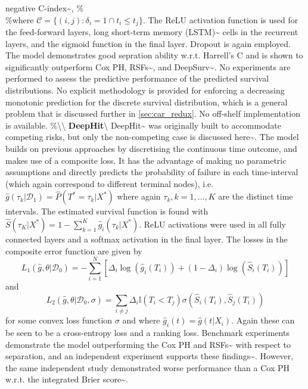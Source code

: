 \documentclass[
  letterpaper,
]{scrbook}
\theoremstyle{plain}
\theoremstyle{definition}
\theoremstyle{remark}
\begin{document}
negative C-index\textasciitilde{}\cite{Steck2008}, \%\[
%
\] \%where \(\mathcal{C}= \{(i,j) : \delta_i = 1 \cap t_i \leq t_j\}\).
The ReLU activation function is used for the feed-forward layers, long
short-term memory (LSTM)\textasciitilde{}\cite{Hochreiter1997} cells in
the recurrent layers, and the sigmoid function in the final layer.
Dropout is again employed. The model demonstrates good sepration ability
w.r.t. Harrell's C and is shown to significantly outperform Cox PH,
RSFs\textasciitilde{}\cite{Ishwaran2008}, and
DeepSurv\textasciitilde{}\cite{Katzman2018}. No experiments are
performed to assess the predictive performance of the predicted survival
distributions. No explicit methodology is provided for enforcing a
decreasing monotonic prediction for the discrete survival distribution,
which is a general problem that is discussed further in
\ref{sec:car_redux}. No off-shelf implementation is available.
\%\textbackslash\textbackslash{}
\textbf{DeepHit}\label{mod:deephit}\textbackslash{}
DeepHit\textasciitilde{}\cite{Lee2018a} was originally built to
accommodate competing risks, but only the non-competing case is
discussed here\textasciitilde{}\cite{Kvamme2019a}. The model builds on
previous approaches by discretising the continuous time outcome, and
makes use of a composite loss. It has the advantage of making no
parametric assumptions and directly predicts the probability of failure
in each time-interval (which again correspond to different terminal
nodes),
i.e.~\(\hat{g}(\tau_k|\mathcal{D}_1) = \hat{P}(T^* = \tau_k|X^*)\) where
again \(\tau_k, k = 1,...,K\) are the distinct time intervals. The
estimated survival function is found with
\(\hat{S}(\tau_K|X^*) = 1 - \sum^K_{k = 1} \hat{g}_i(\tau_k|X^*)\). ReLU
activations were used in all fully connected layers and a softmax
activation in the final layer. The losses in the composite error
function are given by \[
L_1(\hat{g}, \theta|\mathcal{D}_0) = -\sum^N_{i=1} [\Delta_i \log(\hat{g}_i(T_i)) + (1-\Delta_i)\log(\hat{S}_i(T_i))]
\] and \[
L_2(\hat{g}, \theta|\mathcal{D}_0, \sigma) = \sum_{i \neq j} \Delta_i \mathbb{I}(T_i < T_j) \sigma(\hat{S}_i(T_i), \hat{S}_j(T_i))
\] for some convex loss function \(\sigma\) and where
\(\hat{g}_i(t) = \hat{g}(t|X_i)\). Again these can be seen to be a
cross-entropy loss and a ranking loss. Benchmark experiments demonstrate
the model outperforming the Cox PH and
RSFs\textasciitilde{}\cite{Lee2018a} with respect to separation, and an
independent experiment supports these
findings\textasciitilde{}\cite{Kvamme2019a}. However, the same
independent study demonstrated worse performance than a Cox PH w.r.t.
the integrated Brier score\textasciitilde{}\cite{Graf1999}.
\end{document}
